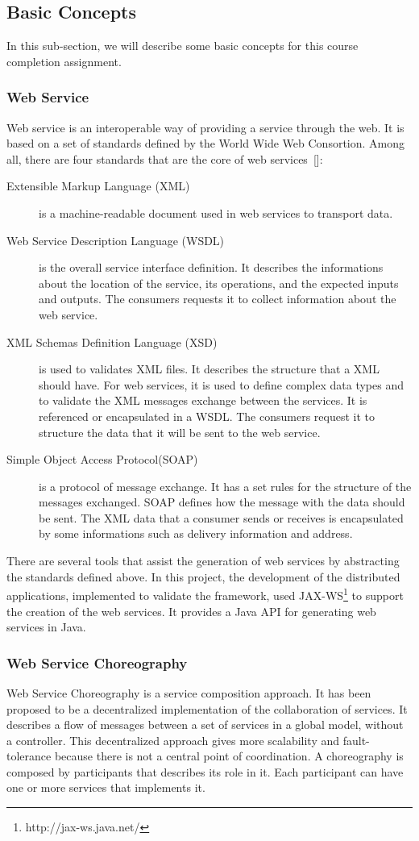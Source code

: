 \subsection{Basic Concepts}
In this sub-section, we will describe some basic concepts for this course completion assignment.

\subsubsection{Web Service}
Web service is an interoperable way of providing a service through the web. It is based on a set of standards defined by the World Wide Web Consortion. Among all, there are four standards that are the core of web services~[\citet{Bean10}]:
\begin{description}
\item[Extensible Markup Language (XML)] is a machine-readable document used in web services to transport data.
\item[Web Service Description Language (WSDL)] is the overall service interface definition. It describes the informations about the location of the service, its operations, and the expected inputs and outputs. The consumers requests it to collect information about the web service.
\item[XML Schemas Definition Language (XSD)] is used to validates XML files. It describes the structure that a XML should have. For web services, it is used to define complex data types and to validate the XML messages exchange between the services. It is referenced or encapsulated in a WSDL. The consumers request it to structure the data that it will be sent to the web service.
\item[Simple Object Access Protocol(SOAP)] is a protocol of message exchange. It has a set rules for the structure of the messages exchanged. SOAP defines how the message with the data should be sent. The XML data that a consumer sends or receives is encapsulated by some informations such as delivery information and address.
\end{description}

There are several tools that assist the generation of web services by abstracting the standards defined above. In this project, the development of the distributed applications, implemented to validate the framework, used JAX-WS\footnote{http://jax-ws.java.net/} to support the creation of the web services. It provides a Java API for generating web services in Java.

\subsubsection{Web Service Choreography}
Web Service Choreography is a service composition approach. It has been proposed to be a decentralized implementation of the collaboration of services.  It describes a flow of messages between a set of services in a global model, without a controller. This decentralized approach gives more scalability and fault-tolerance because there is not a central point of coordination.  A choreography is composed by participants that describes its role in it. Each participant can have one or more services that implements it.

